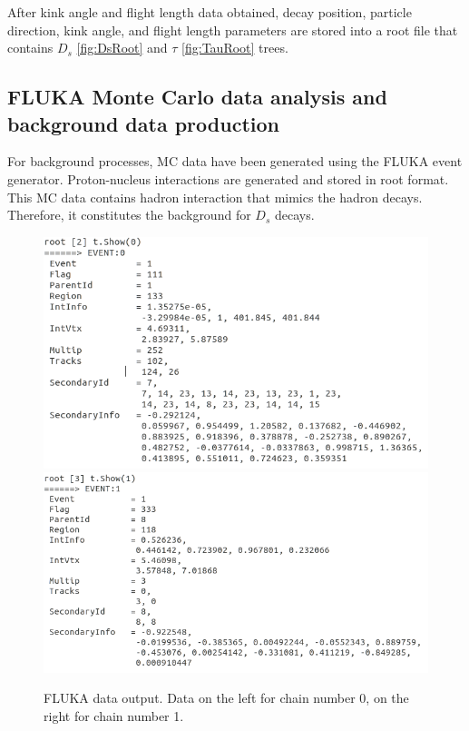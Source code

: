 \documentclass[12pt]{report}
\begin{document}
After kink angle and flight length data obtained, decay position, particle direction, kink angle, and flight length parameters are stored into a root file that contains $D_s$ \ref{fig:DsRoot} and $\tau$ \ref{fig:TauRoot} trees.

\subsection{FLUKA Monte Carlo data analysis and background data production}

For background processes, MC data have been generated using the FLUKA event generator. Proton-nucleus interactions are generated and stored in root format. This MC data contains hadron interaction that mimics the hadron decays. Therefore, it constitutes the background for $D_s$ decays.

\begin{figure}[htp]
\centering
\includegraphics[width = 12 cm]{FlukaDataSS0.png}
\includegraphics[width = 12 cm]{FlukaDataSS1.png}
\caption{FLUKA data output. Data on the left for chain number 0, on the right for chain number 1.}
\label{fig:FlukaData}
\end{figure}
\end{document}
